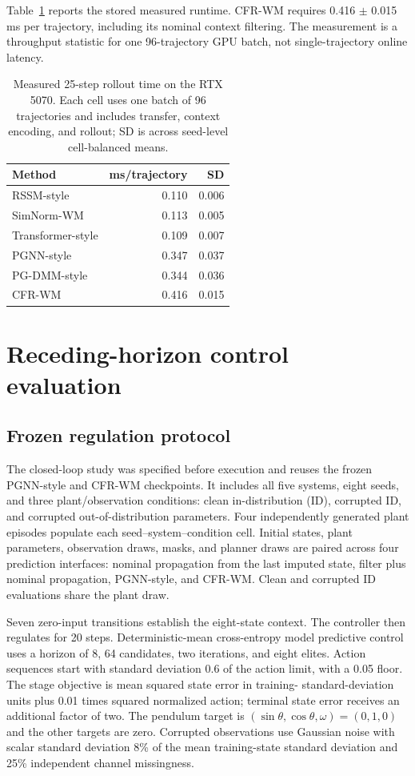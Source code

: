 \documentclass[pdflatex,sn-basic]{sn-jnl}
\newcommand{\method}{CFR-WM}
\newcommand{\CFRLatencyMean}{0.416}
\newcommand{\CFRLatencySD}{0.015}
\begin{document}
Table~\ref{tab:latency} reports the stored measured runtime. CFR-WM requires
\CFRLatencyMean{} $\pm$ \CFRLatencySD{} ms per trajectory, including its
nominal context filtering. The measurement is a throughput statistic for one
96-trajectory GPU batch, not single-trajectory online latency.

\begin{table}[t]
\centering
\caption{Measured 25-step rollout time on the RTX 5070. Each cell uses one
batch of 96 trajectories and includes transfer, context encoding, and rollout;
SD is across seed-level cell-balanced means.}
\label{tab:latency}
\begin{tabular}{lrr}
\toprule
Method & ms/trajectory & SD \\
\midrule
RSSM-style & 0.110 & 0.006 \\
SimNorm-WM & 0.113 & 0.005 \\
Transformer-style & 0.109 & 0.007 \\
PGNN-style & 0.347 & 0.037 \\
PG-DMM-style & 0.344 & 0.036 \\
CFR-WM & 0.416 & 0.015 \\
\bottomrule
\end{tabular}
\end{table}

\section{Receding-horizon control evaluation}

\subsection{Frozen regulation protocol}

The closed-loop study was specified before execution and reuses the frozen
PGNN-style and \method{} checkpoints. It includes all five systems, eight
seeds, and three plant/observation conditions: clean in-distribution (ID),
corrupted ID, and corrupted out-of-distribution parameters. Four independently
generated plant episodes populate each seed--system--condition cell. Initial
states, plant parameters, observation draws, masks, and planner draws are
paired across four prediction interfaces: nominal propagation from the last
imputed state, filter plus nominal propagation, PGNN-style, and \method. Clean
and corrupted ID evaluations share the plant draw.

Seven zero-input transitions establish the eight-state context. The controller
then regulates for 20 steps. Deterministic-mean cross-entropy model predictive
control uses a horizon of 8, 64 candidates, two iterations, and eight elites.
Action sequences start with standard deviation 0.6 of the action limit, with a
0.05 floor. The stage objective is mean squared state error in training-
standard-deviation units plus 0.01 times squared normalized action; terminal
state error receives an additional factor of two. The pendulum target is
$(\sin\theta,\cos\theta,\omega)=(0,1,0)$ and the other targets are zero.
Corrupted observations use Gaussian noise with scalar standard deviation 8\%
of the mean training-state standard deviation and 25\% independent channel
missingness.
\end{document}
